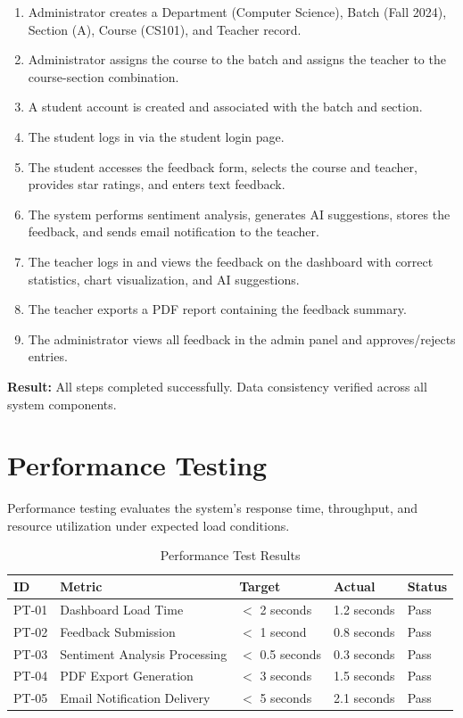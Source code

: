 \begin{enumerate}
    \item Administrator creates a Department (Computer Science), Batch (Fall 2024), Section (A), Course (CS101), and Teacher record.
    \item Administrator assigns the course to the batch and assigns the teacher to the course-section combination.
    \item A student account is created and associated with the batch and section.
    \item The student logs in via the student login page.
    \item The student accesses the feedback form, selects the course and teacher, provides star ratings, and enters text feedback.
    \item The system performs sentiment analysis, generates AI suggestions, stores the feedback, and sends email notification to the teacher.
    \item The teacher logs in and views the feedback on the dashboard with correct statistics, chart visualization, and AI suggestions.
    \item The teacher exports a PDF report containing the feedback summary.
    \item The administrator views all feedback in the admin panel and approves/rejects entries.
\end{enumerate}

\textbf{Result:} All steps completed successfully. Data consistency verified across all system components.


\section{Performance Testing}

Performance testing evaluates the system's response time, throughput, and resource utilization under expected load conditions.

\begin{table}[H]
\centering
\caption{Performance Test Results}
\begin{tabularx}{\textwidth}{|p{1.3cm}|p{3cm}|p{3cm}|p{3cm}|p{1.2cm}|}
\hline
\textbf{ID} & \textbf{Metric} & \textbf{Target} & \textbf{Actual} & \textbf{Status} \\
\hline
PT-01 & Dashboard Load Time & $<$ 2 seconds & 1.2 seconds & Pass \\
\hline
PT-02 & Feedback Submission & $<$ 1 second & 0.8 seconds & Pass \\
\hline
PT-03 & Sentiment Analysis Processing & $<$ 0.5 seconds & 0.3 seconds & Pass \\
\hline
PT-04 & PDF Export Generation & $<$ 3 seconds & 1.5 seconds & Pass \\
\hline
PT-05 & Email Notification Delivery & $<$ 5 seconds & 2.1 seconds & Pass \\
\hline
\end{tabularx}
\end{table}


